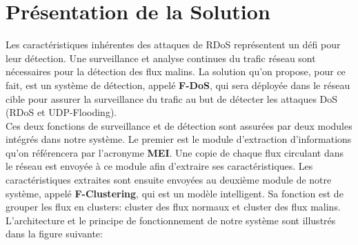 \section{Présentation de la Solution}
Les caractéristiques inhérentes des attaques de RDoS représentent un défi pour leur détection. Une surveillance et analyse continues du trafic réseau sont nécessaires pour la détection des flux malins. La solution qu'on propose, pour ce fait, est un système de détection, appelé \textbf{F-DoS}, qui sera déployée dans le réseau cible pour assurer la surveillance du trafic au but de détecter les attaques DoS (RDoS et UDP-Flooding).\\

Ces deux fonctions de surveillance et de détection sont assurées par deux modules intégrés dans notre système. Le premier est le module d'extraction d'informations qu'on référencera par l'acronyme \textbf{MEI}. Une copie de chaque flux circulant dans le réseau est envoyée à ce module afin d'extraire ses caractéristiques. Les caractéristiques extraites sont ensuite envoyées au deuxième module de notre système, appelé \textbf{F-Clustering}, qui est un modèle intelligent. Sa fonction est de grouper les flux en clusters: cluster des flux normaux et cluster des flux malins.\\

L'architecture et le principe de fonctionnement de notre système sont illustrés dans la figure suivante: \\

